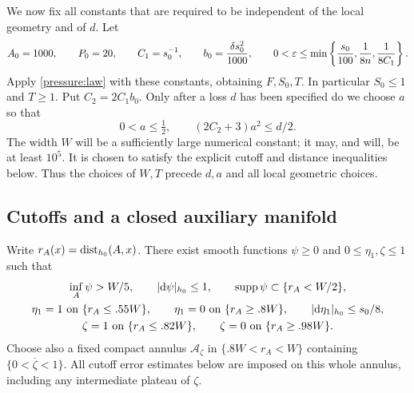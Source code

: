 We now fix all constants that are required to be independent of the local
geometry and of $d$.  Let
\begin{equation}\label{step:constants}
 A_0=1000,\qquad P_0=20,\qquad C_1=s_0^{-1},\qquad
 b_0=\frac{\delta s_0^2}{1000},\qquad
 0<\varepsilon\le\min\left\{\frac{s_0}{100},\frac1{8n},\frac1{8C_1}\right\}.
\end{equation}
Apply \cref{pressure:law} with these constants, obtaining $F,S_0,T$.
In particular $S_0\le1$ and $T\ge1$.  Put $C_2=2C_1b_0$.
Only after a loss $d$ has been specified do we choose $a$ so that
\begin{equation}\label{step:a-choice}
 0<a\le\tfrac12,\qquad (2C_2+3)a^2\le d/2.
\end{equation}
The width $W$ will be a sufficiently large numerical constant; it may,
and will, be at least $10^5$.  It is chosen to satisfy the explicit
cutoff and distance inequalities below.  Thus the choices of $W,T$
precede $d,a$ and all local geometric choices.

\subsection{Cutoffs and a closed auxiliary manifold}

Write $r_A(x)=\operatorname{dist}_{h_0}(A,x)$.  There exist smooth functions
$\psi\ge0$ and $0\le\eta_1,\zeta\le1$ such that
\begin{equation}\label{step:cutoffs}
\begin{gathered}
 \inf_A\psi>W/5,\qquad |\mathrm d\psi|_{h_0}\le1,
 \qquad\operatorname{supp}\psi\subset\{r_A<W/2\},\\
 \eta_1=1\text{ on }\{r_A\le .55W\},\qquad
 \eta_1=0\text{ on }\{r_A\ge .8W\},\qquad
 |\mathrm d\eta_1|_{h_0}\le s_0/8,\\
 \zeta=1\text{ on }\{r_A\le .82W\},\qquad
 \zeta=0\text{ on }\{r_A\ge .98W\}.
\end{gathered}
\end{equation}
Choose also a fixed compact annulus $\mathcal A_\zeta$ in
$\{.8W<r_A<W\}$ containing $\overline{\{0<\zeta<1\}}$.
All cutoff error estimates below are imposed on this whole annulus,
including any intermediate plateau of $\zeta$.


